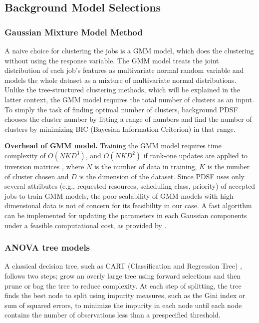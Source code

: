 \documentclass[sigplan,10pt,review,anonymous]{acmart}
\begin{document}
\subsection{Background Model Selections}
\label{sec:section4.1}

\subsubsection{Gaussian Mixture Model Method}
\label{sec:section4.1.1}

A naive choice for clustering the jobs is a GMM model, which does the clustering
without using the response variable. The GMM model treats the joint distribution of each job's features as
multivariate normal random variable and models the whole dataset as a mixture
of multivariate normal distributions. Unlike the tree-structured clustering
methods, which will be explained in the latter context, the GMM model requires
the total number of clusters as an input. To simply the task of finding optimal number of clusters, background PDSF chooses the cluster number by fitting a range of numbers and find the number of clusters by minimizing BIC (Bayesian Information Criterion) in that range.

\textbf{Overhead of GMM model.} Training the GMM model requires time complexity
of $O(NKD^3)$, and $O(NKD^2)$ if rank-one updates are applied to inversion
matrices \cite{10.1371/journal.pone.0139931}, where $N$ is the number of data in
training, $K$ is the number of cluster chosen and $D$ is the dimension of the
dataset. Since PDSF uses only several attributes (e.g., requested
resources, scheduling class, priority) of accepted jobs to train GMM models, the
poor scalability of GMM models with high dimensional data is not of concern for
its feasibility in our case. A fast algorithm can be implemented for updating
the parameters in each Gaussian components under a feasible computational cost,
as provided by \cite{10.1371/journal.pone.0139931}.

\subsubsection{ANOVA tree models}
\label{sec:section4.1.2}

A classical decision tree, such as CART (Classification and Regression Tree)
\cite{Breimanbook}, follows two steps; grow an overly large tree using forward
selections and then prune or bag the tree to reduce complexity. At each step of
splitting, the tree finds the best node to split using impurity measures, such
as the Gini index or sum of squared errors, to minimize the impurity in each
node until each node contains the number of observations less than a
prespecified threshold. 
\end{document}
